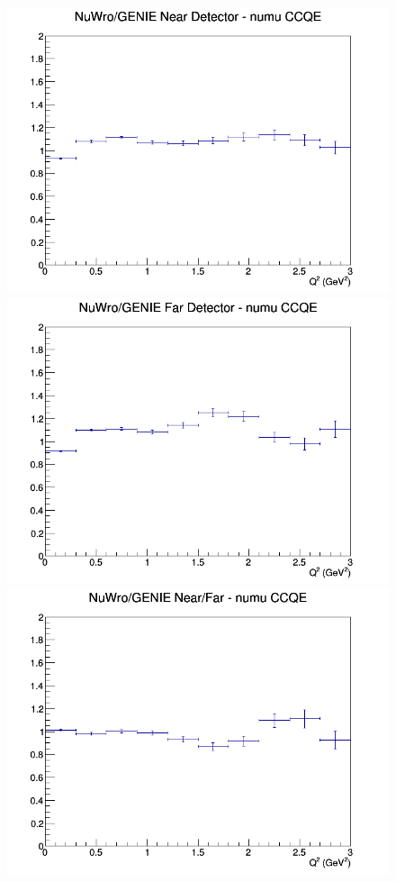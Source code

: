 \begin{figure}[h]
\endminipage
\newline
{}
\includegraphics[width=\linewidth]{eff_Q2/GAr/ratios/CCQE_NuWro_GENIE_numu_near_Q2.png}
\endminipage
{}
\includegraphics[width=\linewidth]{eff_Q2/GAr/ratios/CCQE_NuWro_GENIE_numu_far_Q2.png}
\endminipage
{}
\includegraphics[width=\linewidth]{eff_Q2/GAr/ratios/CCQE_NuWro_GENIE_numu_NF_Q2.png}
\endminipage
\newline
\end{figure}
\clearpage
